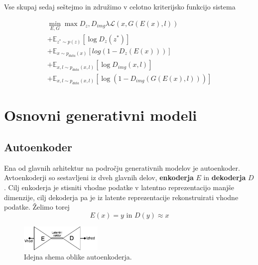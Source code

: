 \documentclass[12pt,a4paper,twoside]{article}
\theoremstyle{definition} %
\theoremstyle{plain} %
\numberwithin{equation}{section}  %
\begin{document}
Vse skupaj sedaj seštejmo in združimo v celotno kriterijsko funkcijo sistema

\begin{equation}
\begin{aligned}
 \min_{E,G} \max{D_z,D_{img}} \lambda \mathcal{L}(x,G(E(x),l))   \\
+ \mathbb{E}_{z^* \sim p(z)}[\log{D_z(z^*)}]  \\
+ \mathbb{E}_{x \sim p_{data}(x)}[log(1-D_z(E(x)))]   \\
+ \mathbb{E}_{x,l \sim p_{data}(x,l)}[\log{D_{img}(x,l)}]  \\ 
+ \mathbb{E}_{x,l \sim p_{data}(x,l)}[\log(1-D_{img}(G(E(x),l)))]
\end{aligned}
\end{equation}


\section{Osnovni generativni modeli}
\subsection{Autoenkoder}
Ena od glavnih arhitektur na področju generativnih modelov je autoenkoder. Avtoenkoderji so sestavljeni iz dveh glavnih delov, \textbf{enkoderja} $E$ in \textbf{dekoderja} $D$. 
Cilj enkoderja je stisniti vhodne podatke v latentno reprezentacijo manjše dimenzije, cilj dekoderja pa je iz latente reprezentacije rekonstruirati vhodne podatke. 
Želimo torej $$ E(x) = y \text{ in } D(y) \approx x $$ 

\begin{figure}[ht]
  \centering
  \includegraphics[width=0.35\textwidth]{images/autoencoder_schema.png}
 \caption[Idejna shema oblike autoenkoderja]{Idejna shema oblike autoenkoderja.}
  \label{fig:autoencoder-shape}
\end{figure}
\end{document}
